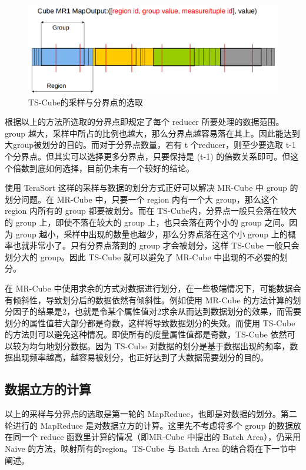 \begin{figure}[!htb] 
\centering\includegraphics[width=6in]{picture/ch_terasort_mr/tscube_picture} 
\caption{TS-Cube的采样与分界点的选取}\label{tscube_picture} 
\end{figure}

根据以上的方法所选取的分界点即规定了每个 reducer 所要处理的数据范围。group 越大，采样中所占的比例也越大，那么分界点越容易落在其上。因此能达到大group被划分的目的。而对于分界点数量，若有 t 个reducer，则至少要选取 t-1 个分界点。但其实可以选择更多分界点，只要保持是 (t-1) 的倍数关系即可。但这个倍数到底如何选择，目前仍未有一个较好的结论。

使用 TeraSort 这样的采样与数据的划分方式正好可以解决 MR-Cube 中 group 的划分问题。在 MR-Cube 中，只要一个 region 内有一个大 group，那么这个 region 内所有的 group 都要被划分。而在 TS-Cube内，分界点一般只会落在较大的 group 上，即使不落在较大的 group 上，也只会落在两个小的 group 之间。因为 group 越小，采样中出现的数量也越少，那么分界点落在这个小 group 上的概率也就非常小了。只有分界点落到的 group 才会被划分，这样 TS-Cube 一般只会划分大的 group。因此 TS-Cube 就可以避免了 MR-Cube 中出现的不必要的划分。

在 MR-Cube 中使用求余的方式对数据进行划分，在一些极端情况下，可能数据会有倾斜性，导致划分后的数据依然有倾斜性。例如使用 MR-Cube 的方法计算的划分因子的结果是2，也就是令某个属性值对2求余从而达到数据划分的效果，而需要划分的属性值若大部分都是奇数，这样将导致数据划分的失效。而使用 TS-Cube 的方法则可以避免这种情况。即使所有的度量属性值都是奇数，TS-Cube 依然可以较为均匀地划分数据。因为 TS-Cube 对数据的划分是基于数据出现的频率，数据出现频率越高，越容易被划分，也正好达到了大数据需要划分的目的。

\subsection{数据立方的计算}

以上的采样与分界点的选取是第一轮的 MapReduce，也即是对数据的划分。第二轮进行的 MapReduce 是对数据立方的计算。这里先不考虑将多个 group 的数据放在同一个 reduce 函数里计算的情况（即MR-Cube 中提出的 Batch Area），仍采用 Naive 的方法，映射所有的region。TS-Cube 与 Batch Area 的结合将在下一节中阐述。

